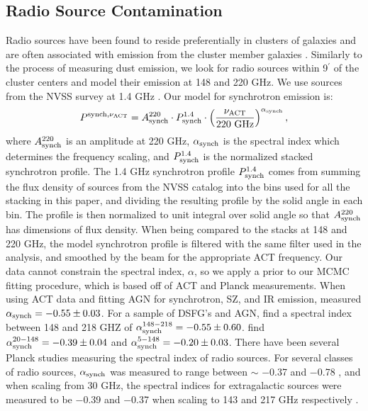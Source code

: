 \documentclass[a4paper,fleqn,usenatbib]{mnras}
\begin{document}
\subsection{Radio Source Contamination}
\label{sec:radioprof}
Radio sources have been found to reside preferentially in clusters of galaxies and are often associated with emission from the cluster member galaxies \citep{2002ApJ...580...36H,2007ApJS..170...71L,2007AJ....134..897C,2009ApJ...694..992L, 2011ApJ...734..103G}. 
Similarly to the process of measuring dust emission, we look for radio sources within 9$^\prime$ of the cluster centers and model their emission at 148 and 220 GHz. 
We use sources from the NVSS survey at 1.4 GHz \citep{1998AJ....115.1693C}. 
Our model for synchrotron emission is:
\begin{equation}
  \label{eq:radioSED}
  \centering
  P^{\rm synch, \nu_{\rm ACT}} = A^{220}_{\rm synch} \cdot P^{1.4}_{\rm synch} \cdot \left(\frac{\nu_{\rm ACT}}{220 \ \rm GHz}\right)^{\alpha_{\rm synch}},  
\end{equation}
where $A^{220}_{\rm synch}$ is an amplitude at 220 GHz, $\alpha_{\rm synch}$ is the spectral index which determines the frequency scaling, and $P^{1.4}_{\rm synch}$ is the normalized stacked synchrotron profile.
The 1.4 GHz synchrotron profile $P^{1.4}_{\rm synch}$ comes from summing the flux density of sources from the NVSS catalog into the bins used for all the stacking in this paper, and dividing the resulting profile by the solid angle in each bin. 
The profile is then normalized to unit integral over solid angle so that $A^{220}_{\rm synch}$ has dimensions of flux density.
When being compared to the stacks at 148 and 220 GHz, the model synchrotron profile is filtered with the same filter used in the analysis, and smoothed by the beam for the appropriate ACT frequency.
Our data cannot constrain the spectral index, $\alpha$, so we apply a prior to our MCMC fitting procedure, which is based off of ACT and Planck measurements.
When using ACT data and fitting AGN for synchrotron, SZ, and IR emission, \cite{2014MNRAS.445..460G} measured $\alpha_{\rm synch} = -0.55 \pm 0.03$.
For a sample of DSFG's and AGN, \cite{2014MNRAS.439.1556M} find a spectral index between 148 and 218 GHZ of $\alpha^{148-218}_{\rm synch} = -0.55 \pm 0.60$.
\cite{2011ApJ...731..100M} find $\alpha^{20-148}_{\rm synch} = -0.39 \pm 0.04$ and $\alpha^{5-148}_{\rm synch} = -0.20 \pm 0.03$.
There have been several Planck studies measuring the spectral index of radio sources.
For several classes of radio sources, $\alpha_{\rm synch}$ was measured to range between $\sim$ $-$0.37 and $-$0.78  \citep{2016A&A...596A.106P}, and when scaling from 30 GHz, the spectral indices for extragalactic sources were measured to be $-$0.39 and $-$0.37 when scaling to 143 and 217 GHz respectively \citep{2011A&A...536A..12P}.
\end{document}
